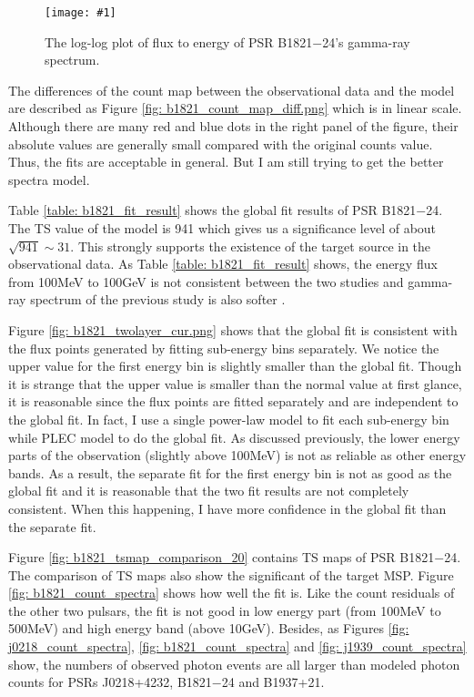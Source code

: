 \documentclass[a4paper, 12pt]{report}
\newcommand{\singleFig}[3]{
  \begin{figure}[!htp]
    \centering
    \texttt{[image: \#1]}
    \caption{#3}
    \label{fig: #1}
  \end{figure}
}
\begin{document}
      \singleFig{b1821_cur.png}{0.37}{The log-log plot of flux to energy of 
        PSR B1821$-$24's gamma-ray spectrum. }
      \vspace{1cm}

      The differences of the count map between the observational data and the model are described 
      as Figure \ref{fig: b1821_count_map_diff.png} which is in linear scale. Although there are 
      many red and blue dots in the right panel of the figure, their absolute values are 
      generally small compared with the original counts value.
      Thus, the fits are acceptable in general. But I am still trying to get the better spectra 
      model. 

      Table \ref{table: b1821_fit_result} shows the global fit results of PSR B1821$-$24. 
      The TS value of the model is 941 which gives us a significance level 
      of about $\sqrt{941} \sim 31$. This strongly supports the existence of the target source in 
      the observational data. As Table \ref{table: b1821_fit_result} shows, the energy flux from 
      100MeV to 100GeV is not consistent between the two studies and gamma-ray spectrum of the 
      previous study is also softer \citep{2013ApJ...778..106J}.

      Figure \ref{fig: b1821_twolayer_cur.png} shows that the global fit is consistent with 
      the flux points generated by fitting sub-energy bins separately. We notice the upper value 
      for the first energy bin is slightly smaller than the global fit. 
      Though it is strange that the upper value is smaller than the normal value at first glance, 
      it is reasonable since the flux points are fitted separately and are independent to 
      the global fit. In fact, I use a single power-law model to fit each sub-energy bin while 
      PLEC model to do the global fit. As discussed previously, the lower energy parts of 
      the observation (slightly above 100MeV) is not as reliable as other energy bands. As a result, the 
      separate fit for the first energy bin is not as good as the global fit and it is reasonable 
      that the two fit results are not completely consistent. When this happening, I have 
      more confidence in the global fit than the separate fit.
            
      Figure \ref{fig: b1821_tsmap_comparison_20} contains TS maps of PSR B1821$-$24. The 
      comparison of TS maps also show the significant of the target MSP. Figure 
      \ref{fig: b1821_count_spectra} shows how well the fit is. Like the count residuals of 
      the other two pulsars, the fit is not good in low energy part (from 100MeV to 500MeV)
      and high energy band (above 10GeV). Besides, as Figures \ref{fig: j0218_count_spectra},
      \ref{fig: b1821_count_spectra} and \ref{fig: j1939_count_spectra} show, the numbers of 
      observed photon events are all larger than modeled photon counts for PSRs J0218+4232, 
      B1821$-$24 and B1937+21. 
\end{document}
